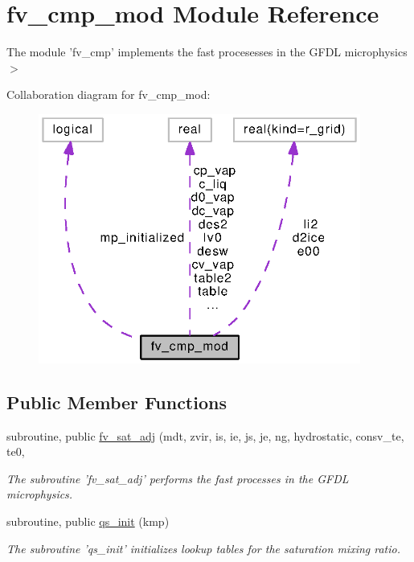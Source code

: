 \section{fv\-\_\-cmp\-\_\-mod Module Reference}
\label{classfv__cmp__mod}


The module 'fv\-\_\-cmp' implements the fast procesesses in the G\-F\-D\-L microphysics $>$  




Collaboration diagram for fv\-\_\-cmp\-\_\-mod\-:
\nopagebreak
\begin{figure}[H]
\begin{center}
\leavevmode
\includegraphics[width=300pt]{classfv__cmp__mod__coll__graph}
\end{center}
\end{figure}
\subsection*{Public Member Functions}
\begin{DoxyCompactItemize}
\item 
subroutine, public \hyperlink{classfv__cmp__mod_a4316f04a563345186c026003ed5ebe96}{fv\-\_\-sat\-\_\-adj} (mdt, zvir, is, ie, js, je, ng, hydrostatic, consv\-\_\-te, te0,
\begin{DoxyCompactList}\small\item\em The subroutine 'fv\-\_\-sat\-\_\-adj' performs the fast processes in the G\-F\-D\-L microphysics. \end{DoxyCompactList}\item 
subroutine, public \hyperlink{classfv__cmp__mod_a5ce7347205d43a859b0316a584642f4d}{qs\-\_\-init} (kmp)
\begin{DoxyCompactList}\small\item\em The subroutine 'qs\-\_\-init' initializes lookup tables for the saturation mixing ratio. \end{DoxyCompactList}\end{DoxyCompactItemize}
